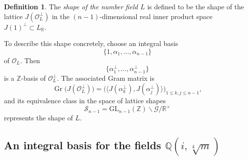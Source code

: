 \documentclass{amsart}
\newcommand{\Q}{\mathbb{Q}}
\newcommand{\op}[1]{\operatorname{#1}}
\newcommand{\R}{\mathbb{R}}
\newcommand{\Z}{\mathbb{Z}}
\newcommand{\GL}{\mathrm{GL}}
\newcommand{\cO}{\mathcal{O}}
\theoremstyle{plain}
\theoremstyle{definition}
\newtheorem{definition}[theorem]{Definition}
\theoremstyle{remark}
\numberwithin{equation}{section}
\begin{document}
\begin{definition}
The \emph{shape of the number field $L$} is defined to be the shape of the lattice $J(\cO_L^\perp)$ in the $(n-1)$-dimensional real inner product space $J(1)^\perp \subset L_\R$.
\end{definition}

\par
To describe this shape concretely, choose an integral basis
\[
\{1,\alpha_1,\dots,\alpha_{n-1}\}
\]
of $\cO_L$. Then
\[
\{\alpha_1^\perp,\dots,\alpha_{n-1}^\perp\}
\]
is a $\Z$-basis of $\cO_L^\perp$. The associated Gram matrix is
\[
\op{Gr}\bigl(J(\cO_L^\perp)\bigr)
=
\bigl(\langle J(\alpha_k^\perp),J(\alpha_j^\perp)\rangle\bigr)_{1\le k,j\le n-1},
\]
and its equivalence class in the space of lattice shapes
\[
\mathcal S_{n-1}=\GL_{n-1}(\Z)\backslash \mathcal G/\R^\times
\]
represents the shape of $L$.


\subsection{An integral basis for the fields $\Q(i,\sqrt[4]{m})$}\label{s 1.3}
\end{document}
